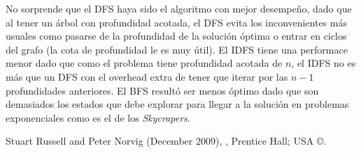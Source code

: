 \documentclass[%
    final,
    reprint,
    notitlepage,
    narroweqnarray,
    inline,
    twoside,
    invited
    ]{ieee}
\begin{document}
\par No sorprende que el DFS haya sido el algoritmo con mejor desempeño, dado que al tener un árbol con profundidad acotada, el DFS evita los inconvenientes más usuales como pasarse de la profundidad de la solución óptima o entrar en ciclos del grafo (la cota de profundidad le es muy útil). El IDFS tiene una performace menor dado que como el problema tiene profundidad acotada de $n$, el IDFS no es más que un DFS con el overhead extra de tener que iterar por las $n-1$ profundidades anteriores. El BFS resultó ser menos óptimo dado que son demasiados los estados que debe explorar para llegar a la solución en problemas exponenciales como es el de los \textit{Skycrapers}. 

%
%
%
%
%


\begin{thebibliography}{1}

Stuart Russell and Peter Norvig (December 2009),
,
\newblock Prentice Hall; USA \copyright.







\end{thebibliography}
\end{document}
